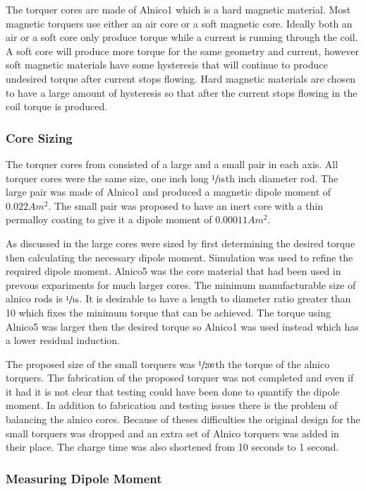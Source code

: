 The torquer cores are made of Alnico1 which is a hard magnetic material. Most magnetic torquers use either an air core or a soft magnetic core. Ideally both an air or a soft core only produce torque while a current is running through the coil. A soft core will produce more torque for the same geometry and current, however soft magnetic materials have some hysteresis that will continue to produce undesired torque after current stops flowing. Hard magnetic materials are chosen to have a large amount of hysteresis so that after the current stops flowing in the coil torque is produced. 

\subsubsection{Core Sizing}

The torquer cores from \cite{Mentch11} consisted of a large and a small pair in each axis. All torquer cores were the same size, one inch long $\sfrac{1}{16}$th inch diameter rod. The large pair was made of Alnico1 and produced a magnetic dipole moment of $0.022 \unit{A m^2}$. The small pair was proposed to have an inert core with a thin permalloy coating to give it a dipole moment of $0.00011 \unit{A m^2}$.

As discussed in \cite{Mentch11} the large cores were sized by first determining the desired torque then calculating the necessary dipole moment. Simulation was used to refine the required dipole moment. Alnico5 was the core material that had been used in prevous expariments for much larger cores. The minimum manufacturable size of alnico rods is $\sfrac{1}{16}$. It is desirable to have a length to diameter ratio greater than 10 which fixes the minimum torque that can be achieved. The torque using Alnico5 was larger then the desired torque so Alnico1 was used instead which has a lower residual induction. 

The proposed size of the small torquers was $\sfrac{1}{200}$th the torque of the alnico torquers. The fabrication of the proposed torquer was not completed and even if it had it is not clear that testing could have been done to quantify the dipole moment. In addition to fabrication and testing issues there is the problem of balancing the alnico cores. Because of theses difficulties the original design for the small torquers was dropped and an extra set of Alnico torquers was added in their place. The charge time was also shortened from 10 seconds to 1 second.

\subsubsection{Measuring Dipole Moment}

